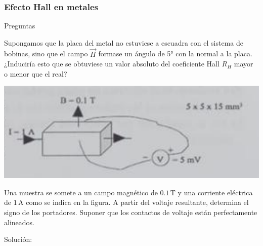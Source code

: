 \vspace*{2em}

\begin{Enunciado}
    \subsubsection{Efecto Hall en metales}
        Preguntas
        \begin{enumerate}[label=\alph*)]
        \begin{minipage}{0.5\linewidth}
        \item Supongamos que la placa del metal no estuviese a escuadra con el sistema de bobinas, sino que el campo \( \vec{H} \) formase un ángulo de 5° con la normal a la placa. ¿Induciría esto que se obtuviese un valor absoluto del coeficiente Hall \( R_H \) mayor o menor que el real?
        
        \end{minipage}\hfill\begin{minipage}{0.45\linewidth}
            \includegraphics[width=0.9\linewidth]{Cuerpo/Ch_02/Examen_24_8.png}
        \end{minipage}
        \item Una muestra se somete a un campo magnético de \( 0.1\,\text{T} \) y una corriente eléctrica de \( 1\,\text{A} \) como se indica en la figura. A partir del voltaje resultante, determina el signo de los portadores. Suponer que los contactos de voltaje están perfectamente alineados. 
        \end{enumerate}
\end{Enunciado}

Solución:

